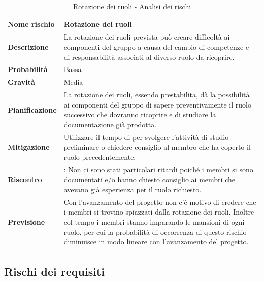 \documentclass[12pt,a4paper]{article}
\begin{document}
\begin{table}[H]
	\begin{center}
		\begin{tabular}{p{} p{}}
			\toprule
			\textbf{Nome rischio} & \textbf{Rotazione dei ruoli} \\
			\midrule
			\midrule
			\textbf{Descrizione} & La rotazione dei ruoli prevista può creare difficoltà ai componenti del gruppo a causa del cambio
			di competenze e di responsabilità associati al diverso ruolo da ricoprire. \\
			\midrule
			\textbf{Probabilità} & Bassa \\
			\midrule
			\textbf{Gravità} & Media \\
			\midrule
			\textbf{Pianificazione} &  La rotazione dei ruoli, essendo prestabilita, dà la possibilità ai componenti del gruppo di sapere preventivamente il ruolo successivo che dovranno ricoprire e di studiare la documentazione già prodotta. \\
			\midrule
			\textbf{Mitigazione} & Utilizzare il tempo di \mgls{slack} per svolgere l'attività di studio preliminare o chiedere consiglio al membro che ha coperto il ruolo precedentemente. \\
            \midrule
            \textbf{Riscontro} & \textbf{\FA{}}: Non ci sono stati particolari ritardi poiché i membri si sono documentati e/o hanno chiesto consiglio ai membri che avevano già esperienza per il ruolo richiesto. \\
            \midrule
            \textbf{Previsione} & Con l'avanzamento del progetto non c'è motivo di credere che i membri si trovino spiazzati dalla rotazione dei ruoli. Inoltre col tempo i membri stanno imparando le mansioni di ogni ruolo, per cui la probabilità di occorrenza di questo rischio diminuisce in modo lineare con l'avanzamento del progetto. \\
			\bottomrule
		\end{tabular}
		\caption{Rotazione dei ruoli - Analisi dei rischi}
	\end{center}
\end{table}

\subsection{Rischi dei requisiti}
\end{document}
